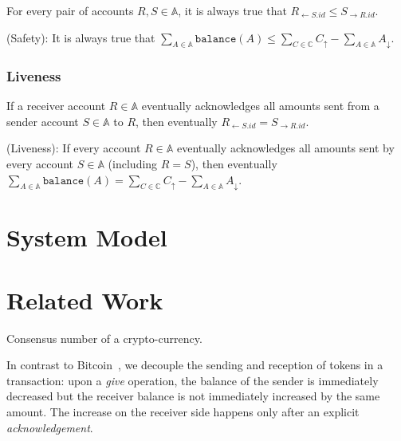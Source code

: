 \documentclass[9pt, oneside]{article}   	%
\begin{document}
For every pair of accounts $R,S \in \mathds{A}$, it is always true that $R_{\leftarrow S.id} \leq S_{\rightarrow R.id}$.

(Safety): It is always true that $\sum\limits_{A \in \mathds{A}} \texttt{balance}(A) \leq  \sum\limits_{C \in \mathds{C}} C_\uparrow - \sum\limits_{A \in \mathds{A}} A_\downarrow$.


\subsubsection{Liveness}

If a receiver account $R \in \mathds{A}$ eventually acknowledges all amounts sent from a sender account $S \in \mathds{A}$ to $R$, then eventually $R_{\leftarrow S.id} = S_{\rightarrow R.id}$.

(Liveness): If every account $R \in \mathds{A}$ eventually acknowledges all amounts sent by every account $S \in \mathds{A}$ (including $R=S$), then eventually $\sum\limits_{A \in \mathds{A}} \texttt{balance}(A) = \sum\limits_{C \in \mathds{C}} C_\uparrow - \sum\limits_{A \in \mathds{A}} A_\downarrow$.

\section{System Model}




\section{Related Work}

Consensus number of a crypto-currency.

 In contrast to Bitcoin~\cite{bitcoin}, we decouple the sending and reception of tokens in a transaction: upon a \textit{give} operation, the balance of the sender is immediately decreased but the receiver balance is not immediately increased by the same amount.  The increase on the receiver side happens only  after an explicit \textit{acknowledgement}. 
 
\end{document}
